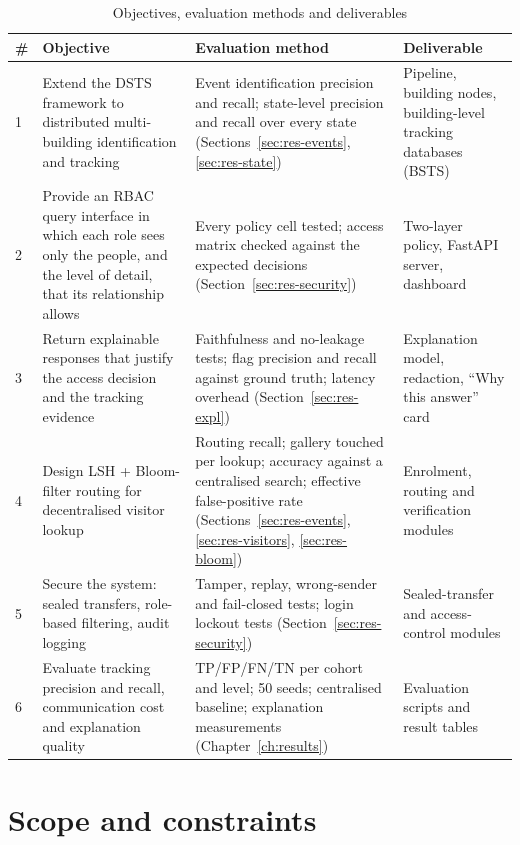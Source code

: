 \documentclass[12pt,a4paper,oneside]{report}
\begin{document}
\begin{table}[htbp]
\centering
\caption{Objectives, evaluation methods and deliverables}\label{tab:objectives}
{\small\setlength{\tabcolsep}{4pt}\renewcommand{\arraystretch}{1.2}
\begin{tabular}{|p{0.6cm}|p{4.4cm}|p{5.2cm}|p{3.6cm}|}\hline
\textbf{\#} & \textbf{Objective} & \textbf{Evaluation method} & \textbf{Deliverable}\\\hline
1 & Extend the DSTS framework to distributed multi-building identification and tracking & Event identification precision and recall; state-level precision and recall over every state (Sections~\ref{sec:res-events}, \ref{sec:res-state}) & Pipeline, building nodes, building-level tracking databases (BSTS)\\\hline
2 & Provide an RBAC query interface in which each role sees only the people, and the level of detail, that its relationship allows & Every policy cell tested; access matrix checked against the expected decisions (Section~\ref{sec:res-security}) & Two-layer policy, FastAPI server, dashboard\\\hline
3 & Return explainable responses that justify the access decision and the tracking evidence & Faithfulness and no-leakage tests; flag precision and recall against ground truth; latency overhead (Section~\ref{sec:res-expl}) & Explanation model, redaction, ``Why this answer'' card\\\hline
4 & Design LSH + Bloom-filter routing for decentralised visitor lookup & Routing recall; gallery touched per lookup; accuracy against a centralised search; effective false-positive rate (Sections~\ref{sec:res-events}, \ref{sec:res-visitors}, \ref{sec:res-bloom}) & Enrolment, routing and verification modules\\\hline
5 & Secure the system: sealed transfers, role-based filtering, audit logging & Tamper, replay, wrong-sender and fail-closed tests; login lockout tests (Section~\ref{sec:res-security}) & Sealed-transfer and access-control modules\\\hline
6 & Evaluate tracking precision and recall, communication cost and explanation quality & TP/FP/FN/TN per cohort and level; 50 seeds; centralised baseline; explanation measurements (Chapter~\ref{ch:results}) & Evaluation scripts and result tables\\\hline
\end{tabular}}
\end{table}

\section{Scope and constraints}
\end{document}
